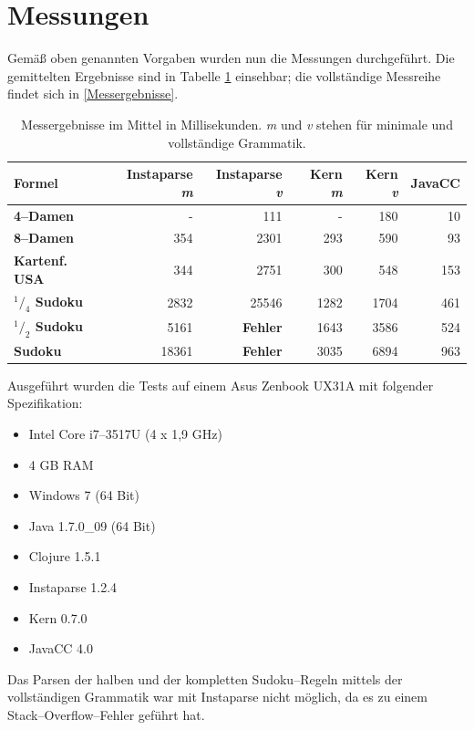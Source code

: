 \documentclass[ngerman,a4paper,abstracton,open=right,twoside=false,toc=listofnumbered,bibtotocnumbered]{scrreprt}
\begin{document}
\section{Messungen}

Gemäß oben genannten Vorgaben wurden nun die Messungen durchgeführt. Die gemittelten Ergebnisse sind in Tabelle \ref{messergebnisse-kurz} einsehbar; die vollständige Messreihe findet sich in \ref{Messergebnisse}.

\begin{table}[h]
	\begin{tabular}{|l|r|r|r|r|r|}
		\hline
		\textbf{Formel} & \textbf{Instaparse \emph{m}} & \textbf{Instaparse \emph{v}} & \textbf{Kern \emph{m}} & \textbf{Kern \emph{v}} & \textbf{JavaCC} \\ \hline
		\textbf{4--Damen} & - & 111 & - & 180 & 10 \\ \hline
		\textbf{8--Damen} & 354 & 2301 & 293 & 590 & 93 \\ \hline
		\textbf{Kartenf. USA} & 344 & 2751 & 300 & 548 & 153 \\ \hline
		\textbf{$^1/_4$ Sudoku} & 2832 & 25546 & 1282 & 1704 & 461 \\ \hline
		\textbf{$^1/_2$ Sudoku} & 5161 & \textbf{Fehler} & 1643 & 3586 & 524 \\ \hline
		\textbf{Sudoku} & 18361 & \textbf{Fehler} & 3035 & 6894 & 963 \\ \hline 
	\end{tabular}
	\label{messergebnisse-kurz}
	\caption{Messergebnisse im Mittel in Millisekunden. \emph{m} und \emph{v} stehen für \glqq{}minimale\grqq{} und \glqq{}vollständige Grammatik\grqq.}
\end{table}

Ausgeführt wurden die Tests auf einem Asus Zenbook UX31A mit folgender Spezifikation:

\begin{itemize}
	\item Intel Core i7--3517U (4 x 1,9 GHz)
	\item 4 GB RAM
	\item Windows 7 (64 Bit)
	\item Java 1.7.0\_09 (64 Bit)
	\item Clojure 1.5.1
	\item Instaparse 1.2.4
	\item Kern 0.7.0
	\item JavaCC 4.0
\end{itemize}

Das Parsen der halben und der kompletten Sudoku--Regeln mittels der vollständigen Grammatik war mit Instaparse nicht möglich, da es zu einem Stack--Overflow--Fehler geführt hat.
\end{document}
